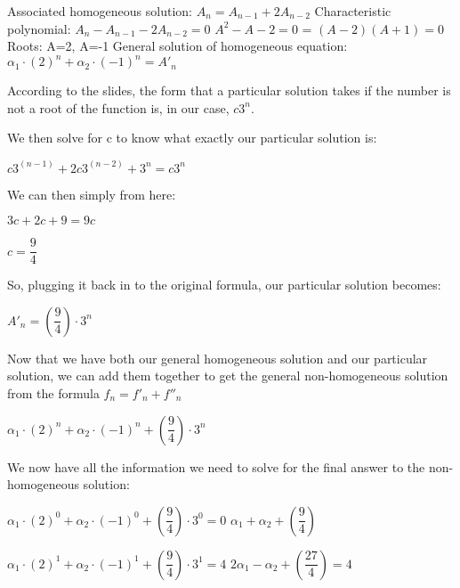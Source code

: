 \documentclass{article}
\begin{document}
\begin{solution}
Associated homogeneous solution: $A_{n} = A_{n-1} + 2A_{n-2}$
\newline
Characteristic polynomial: $A_n - A_{n-1} - 2A_{n-2} = 0$
\newline
$A^2-A-2=0$ = $(A-2)(A+1)=0$
\newline
Roots: A=2, A=-1
\newline
General solution of homogeneous equation:
$\alpha_1 \cdot (2)^n + \alpha_2 \cdot (-1)^n = A'_n$
\newline

According to the slides, the form that a particular solution takes if the number is not a root of the function is, in our case, $c3^n$.
\newline

We then solve for c to know what exactly our particular solution is:
\newline

$c3^{(n-1)}+2c3^{(n-2)}+3^n = c3^n$
\newline

We can then simply from here:
\newline

$3c + 2c + 9 = 9c$
\newline

$c = \dfrac{9}{4}$
\newline

So, plugging it back in to the original formula, our particular solution becomes:
\newline

$A'_n = (\dfrac{9}{4}) \cdot 3^n$
\newline

Now that we have both our general homogeneous solution and our particular solution, we can add them together to get the general non-homogeneous solution from the formula $f_n = f'_n + f''_n$
\newline

$\alpha_1 \cdot (2)^n + \alpha_2 \cdot (-1)^n + (\dfrac{9}{4}) \cdot 3^n$
\newline

We now have all the information we need to solve for the final answer to the non-homogeneous solution:
\newline

$\alpha_1 \cdot (2)^0 + \alpha_2 \cdot (-1)^0 + (\dfrac{9}{4}) \cdot 3^0 = 0$
$\alpha_1 + \alpha_2 + (\dfrac{9}{4})$
\newline

$\alpha_1 \cdot (2)^1 + \alpha_2 \cdot (-1)^1 + (\dfrac{9}{4}) \cdot 3^1 = 4$
$2\alpha_1 - \alpha_2 + (\dfrac{27}{4}) = 4$
\newline


\end{solution}
\end{document}
